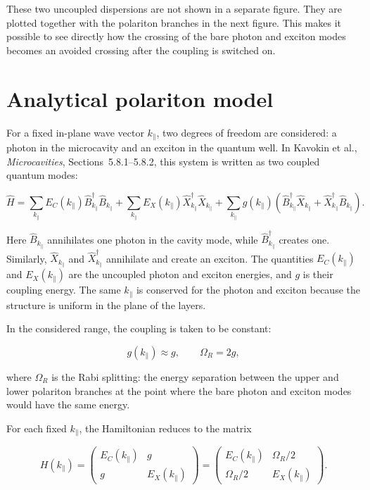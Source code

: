 \documentclass[12pt,a4paper]{article}
\begin{document}
These two uncoupled dispersions are not shown in a separate figure. They are plotted together with the polariton branches in the next figure. This makes it possible to see directly how the crossing of the bare photon and exciton modes becomes an avoided crossing after the coupling is switched on.

\clearpage
\section{Analytical polariton model}

For a fixed in-plane wave vector $k_\parallel$, two degrees of freedom are considered: a photon in the microcavity and an exciton in the quantum well. In Kavokin et al., \textit{Microcavities}, Sections~5.8.1--5.8.2, this system is written as two coupled quantum modes:

\[
\hat H
=
\sum_{k_\parallel}
E_C(k_\parallel)\hat B_{k_\parallel}^{\dagger}\hat B_{k_\parallel}
+
\sum_{k_\parallel}
E_X(k_\parallel)\hat X_{k_\parallel}^{\dagger}\hat X_{k_\parallel}
+
\sum_{k_\parallel}
g(k_\parallel)
\left(
\hat B_{k_\parallel}^{\dagger}\hat X_{k_\parallel}
+
\hat X_{k_\parallel}^{\dagger}\hat B_{k_\parallel}
\right).
\]

Here $\hat B_{k_\parallel}$ annihilates one photon in the cavity mode, while $\hat B_{k_\parallel}^{\dagger}$ creates one. Similarly, $\hat X_{k_\parallel}$ and $\hat X_{k_\parallel}^{\dagger}$ annihilate and create an exciton. The quantities $E_C(k_\parallel)$ and $E_X(k_\parallel)$ are the uncoupled photon and exciton energies, and $g$ is their coupling energy. The same $k_\parallel$ is conserved for the photon and exciton because the structure is uniform in the plane of the layers.

In the considered range, the coupling is taken to be constant:

\[
g(k_\parallel)\approx g,
\qquad
\Omega_R=2g,
\]

where $\Omega_R$ is the Rabi splitting: the energy separation between the upper and lower polariton branches at the point where the bare photon and exciton modes would have the same energy.

For each fixed $k_\parallel$, the Hamiltonian reduces to the matrix

\[
H(k_\parallel)=
\begin{pmatrix}
E_C(k_\parallel) & g\\
g & E_X(k_\parallel)
\end{pmatrix}
=
\begin{pmatrix}
E_C(k_\parallel) & \Omega_R/2\\
\Omega_R/2 & E_X(k_\parallel)
\end{pmatrix}.
\]
\end{document}
